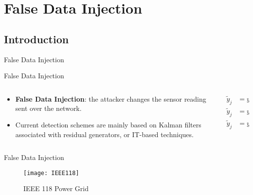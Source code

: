 
\section{False Data Injection}%
\label{sec:fdi}

\subsection{Introduction}%
\label{subsec:fo-introduction}

\begin{slide}{}
  \vspace*{\fill}
  \begin{center}
    \textcolor{fg}{\Large{False Data Injection}}
  \end{center}
  \vspace*{\fill}
\end{slide}

\begin{slide}{False Data Injection}
  \begin{columns}[c]
    \begin{column}{0.48\textwidth}
      \begin{itemize}
        \item \textbf{False Data Injection}: the attacker changes the sensor
              reading sent over the network.
        \item Current detection schemes are mainly based on Kalman filters
              associated with residual generators, or IT-based techniques.
      \end{itemize}
    \end{column}%
    \hfill%
    \begin{column}{0.48\textwidth}
      \begin{align}
        \tilde{y}_{j} & = y_{i},            \\
        \tilde{y}_{j} & = y_{j}+\delta,     \\
        \tilde{y}_{j} & = y_{j}\cdot\alpha,
      \end{align}
    \end{column}%
  \end{columns}
\end{slide}

\begin{slide}{False Data Injection}
  \begin{figure}[ht!]
    \centering \texttt{[image: IEEE118]}
    \caption{IEEE 118 Power Grid}%
    \label{fig:ieee118}
  \end{figure}
\end{slide}

